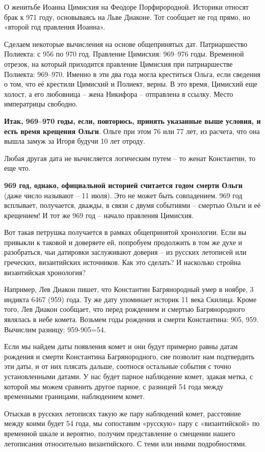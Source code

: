 О женитьбе Иоанна Цимисхия на Феодоре Порфирородной. Историки относят брак к 971 году, основываясь на Льве Диаконе. Тот сообщает не год прямо, но «второй год правления Иоанна».

Сделаем некоторые вычисления на основе общепринятых дат. Патриаршество Полиекта: с 956 по 970 год. Правление Цимисхия: 969–976 годы. Временной отрезок, на который приходится правление Цимисхия при патриаршестве Полиекта: 969–970. Именно в эти два года могла креститься Ольга, если сведения о том, что её крестили Цимисхий и Полиект, верны. В это время, Цимисхий еще холост, а его любовница – жена Никифора – отправлена в ссылку. Место императрицы свободно.

\textbf{Итак, 969–970 годы, если, повторюсь, принять указанные выше условия, и есть время крещения Ольги}. Ольге при этом 76 или 77 лет, из расчета, что она вышла замуж за Игоря будучи 10 лет отроду.

Любая другая дата не вычисляется логическим путем – то женат Константин, то еще что.

\textbf{969 год, однако, официальной историей считается годом смерти Ольги} (даже число называют – 11 июля). Это не может быть совпадением. 969 год всплывает, получается, дважды, в связи с двумя событиями – смертью Ольги и её крещением! И тот же 969 год – начало правления Цимисхия.

Вот такая петрушка получается в рамках общепринятой хронологии. Если вы привыкли к таковой и доверяете ей, попробуем продолжить в том же духе и разобраться, чьи датировки заслуживают доверия – из русских летописей или греческих, византийских источников. Как это сделать? И насколько стройна византийская хронология?

Например, Лев Диакон пишет, что Константин Багрянородный умер в ноябре, 3 индикта 6467 (959) года. Ту же дату упоминает историк 11 века Скилица. Кроме того, Лев Диакон сообщает, что перед рождением и смертью Багрянородного являлась в небе комета. Возьмем годы рождения и смерти Константина: 905, 959. Вычислим разницу: 959-905=54.

Если мы найдем даты появления комет и они будут примерно равны датам рождения и смерти Константина Багрянородного, сие позволит нам подтвердить эти даты, и от них плясать дальше, соотнося остальные события с точно установленными датами. У нас будет парное наблюдение комет, эдакая метка, с которой мы можем сравнить другое парное, с разницей 54 года между временными границами, наблюдением комет.

Отыскав в русских летописях такую же пару наблюдений комет, расстояние между коими будет 54 года, мы сопоставим «русскую» пару с «византийской» по временной шкале и вероятно, получим представление о смещении нашего летописания относительно византийского. С теми или иными подробностями.

